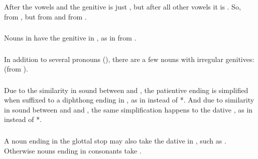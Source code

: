 \subsubsection{} After the vowels  and  the genitive is just
, but after all other vowels it is .  So, 
from , but  from  and 
from .

\subsubsection{} Nouns in  have the genitive in , as in
 from .

\subsubsection{} In addition to several pronouns
(), there are a few nouns with
irregular genitives:  (from ).

\subsubsection{} Due to the similarity in sound between  and
, the patientive ending  is simplified when suffixed to a
diphthong ending in , as in   instead of
*.  And due to similarity in sound between  and and
, the same simplification happens to the dative , as in
  instead of *.

\subsubsection{} A noun ending in the glottal stop may also take the
dative in , such as .  Otherwise
nouns ending in consonants take .

